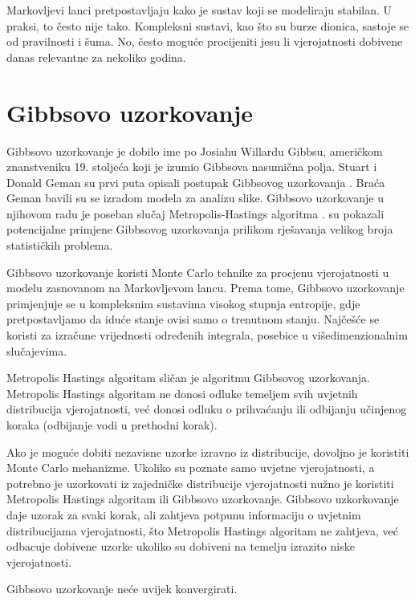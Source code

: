 Markovljevi lanci pretpostavljaju kako je sustav koji se modeliraju stabilan. U praksi, to često nije tako. Kompleksni sustavi, kao što su burze dionica,  sastoje se od pravilnosti i šuma. No, često moguće procijeniti jesu li vjerojatnosti dobivene danas relevantne za nekoliko godina.

\chapter{Gibbsovo uzorkovanje}
\label{cha:gibbs_dsc}
Gibbsovo uzorkovanje je dobilo ime po Josiahu Willardu Gibbsu, američkom znanstveniku 19. stoljeća koji je izumio Gibbsova nasumična polja. Stuart i Donald Geman su prvi puta opisali postupak Gibbsovog uzorkovanja \citep{geman1984stochastic}. Braća Geman bavili su se izradom modela za analizu slike. Gibbsovo uzorkovanje u njihovom radu je poseban slučaj Metropolis-Hastings algoritma \citep{metropolis1953equation}. \citep{gelfand1990sampling} su pokazali potencijalne primjene Gibbsovog uzorkovanja prilikom rješavanja velikog broja statističkih problema.

Gibbsovo uzorkovanje koristi Monte Carlo tehnike za procjenu vjerojatnosti u modelu zasnovanom na Markovljevom lancu. Prema tome, Gibbsovo uzorkovanje primjenjuje se u kompleksnim sustavima visokog stupnja entropije, gdje pretpostavljamo da iduće stanje ovisi samo o trenutnom stanju. Najčešće se koristi za izračune vrijednosti određenih integrala, posebice u višedimenzionalnim slučajevima. 

Metropolis Hastings algoritam sličan je algoritmu Gibbsovog uzorkovanja. Metropolis Hastings algoritam ne donosi odluke temeljem svih uvjetnih distribucija vjerojatnosti, već donosi odluku o prihvaćanju ili odbijanju učinjenog koraka (odbijanje vodi u prethodni korak). 

Ako je moguće dobiti nezavisne uzorke izravno iz distribucije, dovoljno je koristiti Monte Carlo mehanizme. Ukoliko su poznate samo uvjetne vjerojatnosti, a potrebno je uzorkovati iz zajedničke distribucije vjerojatnosti nužno je koristiti Metropolis Hastings algoritam ili Gibbsovo uzorkovanje. Gibbsovo uzkorkovanje daje uzorak za svaki korak, ali zahtjeva potpunu informaciju o uvjetnim distribucijama vjerojatnosti, što Metropolis Hastings algoritam ne zahtjeva, već odbacuje dobivene uzorke ukoliko su dobiveni na temelju izrazito niske vjerojatnosti. 

Gibbsovo uzorkovanje neće uvijek konvergirati. 